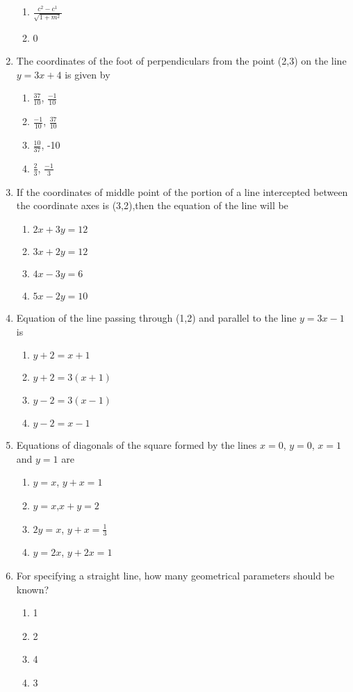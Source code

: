 \begin{enumerate}[resume]
\begin{enumerate}
\item $\frac{c^2-c^1}{\sqrt{1+m^2}}$
\item 0
\end{enumerate}
\item The coordinates of the foot of perpendiculars from the point (2,3) on the line $y=3x+4$ is given by 
\begin{enumerate} 
\item $\frac{37}{10}$, $\frac{-1}{10}$
\item $\frac{-1}{10}$, $\frac{37}{10}$
\item $\frac{10}{37}$, -10
\item $\frac{2}{3}$, $\frac{-1}{3}$
\end{enumerate}
\item If the coordinates of middle point of the portion of a line intercepted between the coordinate axes is (3,2),then the equation of the line will be
\begin{enumerate}
\item $2x+3y=12$
\item $3x+2y=12$
\item $4x-3y=6$
\item $5x-2y=10$
\end{enumerate}
\item Equation of the line passing through (1,2) and parallel to the line $y=3x-1$ is
\begin{enumerate}
\item $y+2=x+1$
\item $y+2=3(x+1)$
\item $y-2=3(x-1)$
\item $y-2=x-1$
\end{enumerate}
\item Equations of diagonals of the square formed by the lines $x=0$, $y=0$, $x=1$ and $y=1$ are
\begin{enumerate}
\item $y=x$, $y+x=1$
\item $y=x$,$x+y=2$
\item $2y=x$, $y+x=\frac{1}{3}$
\item $y=2x$, $y+2x=1$
\end{enumerate}
\item For specifying a straight line, how many geometrical parameters should be known?
\begin{enumerate}
\item 1
\item 2
\item 4
\item 3

\end{enumerate}
\end{enumerate}
